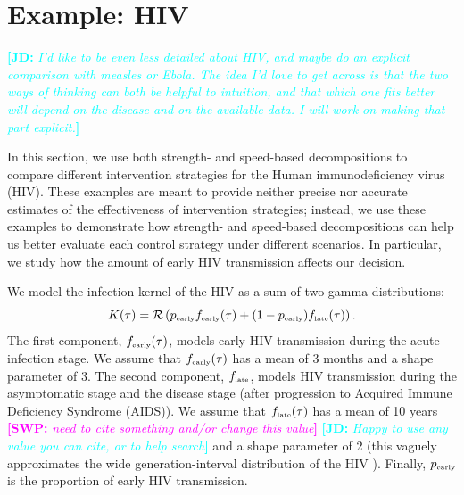 \documentclass[12pt]{article}\usepackage[]{graphicx}\usepackage[]{color}
\newcommand{\comment}[3]{\textcolor{#1}{\textbf{[#2: }\textit{#3}\textbf{]}}}
\newcommand{\jd}[1]{\comment{cyan}{JD}{#1}}
\newcommand{\swp}[1]{\comment{magenta}{SWP}{#1}}
\newcommand{\tsub}[2]{#1_{{\textrm{\tiny #2}}}}
\begin{document}
\section{Example: HIV}

\jd{I'd like to be even less detailed about HIV, and maybe do an explicit comparison with measles or Ebola. The idea I'd love to get across is that the two ways of thinking can both be helpful to intuition, and that which one fits better will depend on the disease and on the available data. I will work on making that part explicit.}

In this section, we use both strength- and speed-based decompositions to compare different intervention strategies for the Human immunodeficiency virus (HIV). 
These examples are meant to provide neither precise nor accurate estimates of the effectiveness of intervention strategies; 
instead, we use these examples to demonstrate how strength- and speed-based decompositions can help us better evaluate each control strategy under different scenarios.
In particular, we study how the amount of early HIV transmission affects our decision.

We model the infection kernel of the HIV as a sum of two gamma distributions:
\begin{equation}
K(\tau) = \mathcal R \left(\tsub{p}{early} \tsub{f}{early}(\tau) + (1-\tsub{p}{early}) \tsub{f}{late}(\tau) \right).
\end{equation}
The first component, $\tsub{f}{early}(\tau)$, models early HIV transmission during the acute infection stage.
We assume that $\tsub{f}{early}(\tau)$ has a mean of 3 months \citep{hollingsworth2008hiv} and a shape parameter of 3.
The second component, $\tsub{f}{late}$, models HIV transmission during the asymptomatic stage and the disease stage (after progression to Acquired Immune Deficiency Syndrome (AIDS)).
We assume that $\tsub{f}{late}(\tau)$ has a mean of 10 years \swp{need to cite something and/or change this value} \jd{Happy to use any value you can cite, or to help search} and a shape parameter of 2 (this vaguely approximates the wide generation-interval distribution of the HIV \citep{fraser2004factors}).
Finally, $\tsub{p}{early}$ is the proportion of early HIV transmission.
\end{document}
